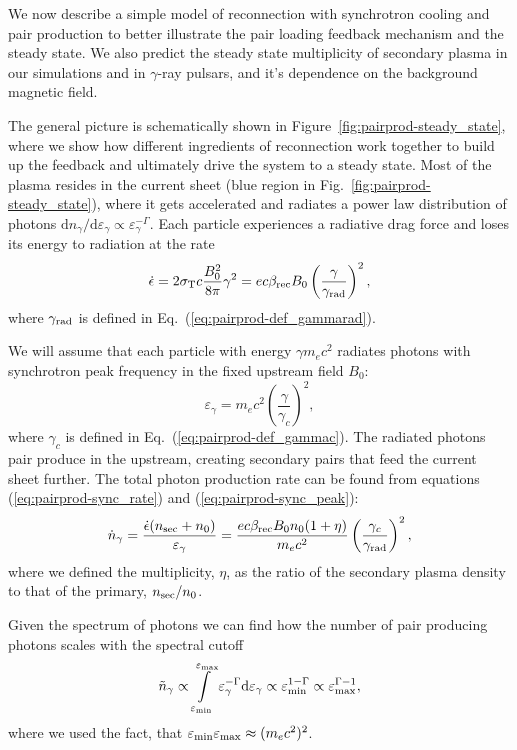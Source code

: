 We now describe a simple model of reconnection with synchrotron cooling and pair production to better illustrate the pair loading feedback mechanism and the steady state. We also predict the steady state multiplicity of secondary plasma in our simulations and in $\gamma$-ray pulsars, and it's dependence on the background magnetic field.

The general picture is schematically shown in Figure~\ref{fig:pairprod-steady_state}, where we show how different ingredients of reconnection work together to build up the feedback and ultimately drive the system to a steady state. Most of the plasma resides in the current sheet (blue region in Fig.~\ref{fig:pairprod-steady_state}), where it gets accelerated and radiates a power law distribution of photons $\mathrm{d}n_\gamma/\mathrm{d}\varepsilon_\gamma\propto\varepsilon_\gamma^{-\Gamma}$. Each particle experiences a radiative drag force and loses its energy to radiation at the rate
\begin{equation}
    \label{eq:pairprod-sync_rate}
    \dot{\epsilon} = 2\sigma_{\rm T} c \frac{B_0^2}{8\pi}\gamma^2 = e c \beta_{\rm rec} B_0 \left(\frac{\gamma}{\gamma_{\rm rad}}\right)^2,
\end{equation}
where $\gamma_{\rm rad}$ is defined in Eq.~(\ref{eq:pairprod-def_gammarad}).

We will assume that each particle with energy $\gamma m_e c^2$ radiates photons with synchrotron peak frequency in the fixed upstream field $B_0$:
\begin{equation}
    \label{eq:pairprod-sync_peak}
    \varepsilon_\gamma = m_e c^2\left(\frac{\gamma}{\gamma_c}\right)^2,
\end{equation}
where $\gamma_c$ is defined in Eq.~(\ref{eq:pairprod-def_gammac}). The radiated photons pair produce in the upstream, creating secondary pairs that feed the current sheet further. The total photon production rate can be found from  equations (\ref{eq:pairprod-sync_rate}) and (\ref{eq:pairprod-sync_peak}):
\begin{equation}\label{eq:pairprod-photon_rate}
    \dot{n}_\gamma = \frac{\dot{\epsilon} (n_{\rm sec} + n_0)}{\varepsilon_\gamma} = \frac{e c \beta_{\rm rec} B_0 n_0 (1+\eta)}{m_e c^2}\left(\frac{\gamma_c}{\gamma_{\rm rad}}\right)^2,
\end{equation}
where we defined the multiplicity, $\eta$, as the ratio of the secondary plasma density to that of the primary, $n_{\rm sec} / n_0$.

Given the spectrum of photons we can find how the number of pair producing photons scales with the spectral cutoff
\begin{equation}\label{eq:pairprod-photon_pp_scale}
    \tilde{n}_\gamma \propto \int\limits_{\varepsilon_{\rm min}}^{\varepsilon_{\rm max}}\varepsilon_\gamma^{-\Gamma}\mathrm{d}\varepsilon_\gamma \propto \varepsilon_{\rm min}^{1-\Gamma}\propto \varepsilon_{\rm max}^{\Gamma - 1},
\end{equation}
where we used the fact, that $\varepsilon_{\rm min}\varepsilon_{\rm max}\approx (m_e c^2)^2$.

